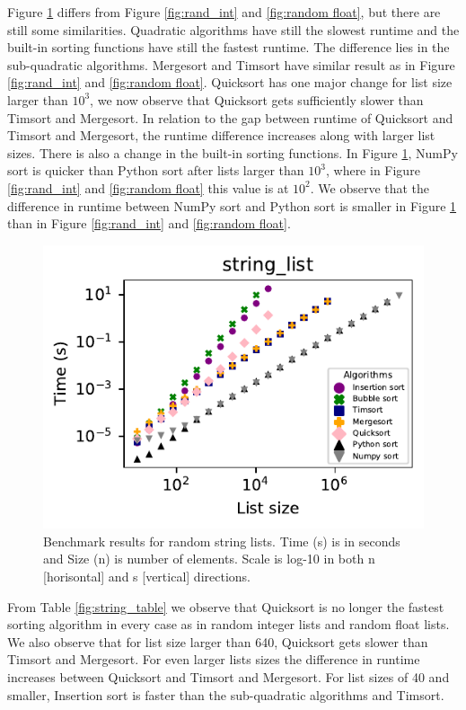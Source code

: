\documentclass[sigconf, nonacm, natbib, screen, balance=False]{acmart}
\begin{document}
Figure \ref{fig:random string} differs from Figure \ref{fig:rand_int} and \ref{fig:random float}, but there are still some similarities. Quadratic algorithms have still the slowest runtime and the built-in sorting functions have still the fastest runtime. The difference lies in the sub-quadratic algorithms. Mergesort and Timsort have similar result as in Figure \ref{fig:rand_int} and \ref{fig:random float}. Quicksort has one major change for list size larger than $10^3$, we now observe that Quicksort gets sufficiently slower than Timsort and Mergesort. In relation to the gap between runtime of Quicksort and Timsort and Mergesort, the runtime difference increases along with larger list sizes. There is also a change in the built-in sorting functions. In Figure \ref{fig:random string}, NumPy sort is quicker than Python sort after lists larger than $10^3$, where in Figure \ref{fig:rand_int} and \ref{fig:random float} this value is at $10^2$. We observe that the difference in runtime between NumPy sort and Python sort is smaller in Figure \ref{fig:random string} than in Figure \ref{fig:rand_int} and \ref{fig:random float}. 

\begin{figure}[h!]
  \includegraphics[width=\linewidth]{../figures/string_list.pdf}
  \caption{Benchmark results for random string lists. Time (s) is in seconds and Size (n) is number of elements. Scale is log-10 in both n [horisontal] and s [vertical] directions.}
  \label{fig:random string}
\end{figure}
\FloatBarrier

From Table \ref{fig:string_table} we observe that Quicksort is no longer the fastest sorting algorithm in every case as in random integer lists and random float lists. We also observe that for list size larger than 640, Quicksort gets slower than Timsort and Mergesort. For even larger lists sizes the difference in runtime increases between Quicksort and Timsort and Mergesort. For list sizes of 40 and smaller, Insertion sort is faster than the sub-quadratic algorithms and Timsort.
\end{document}
